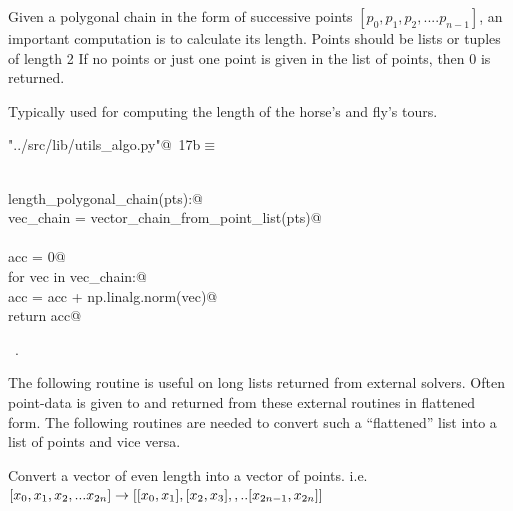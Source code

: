 \documentclass[11.5pt]{report}
\begin{document}
\newchunk Given a polygonal chain in the form of successive points  $[p_0,p_1,p_2,....p_{n-1}]$, 
an important computation is to calculate its length. Points should be lists or tuples of length 2
If no points or just one point is given in the list of points, then 0 is returned.

Typically used for computing the length of the horse's and fly's tours. 

\begin{flushleft} \small\label{scrap13}\raggedright\small
{} \verb@"../src/lib/utils_algo.py"@\nobreak\ {\footnotesize {17b}}$\equiv$
\vspace{-1ex}
\begin{list}{}{} \item
\mbox{}\verb@@\\
\mbox{}\verb@def length_polygonal_chain(pts):@\\
\mbox{}\verb@    vec_chain = vector_chain_from_point_list(pts)@\\
\mbox{}\verb@@\\
\mbox{}\verb@    acc = 0@\\
\mbox{}\verb@    for vec in vec_chain:@\\
\mbox{}\verb@        acc = acc + np.linalg.norm(vec)@\\
\mbox{}\verb@    return acc@\\
\mbox{}\verb@@{\NWsep}
\end{list}
\vspace{-1.5ex}
\footnotesize
\begin{list}{}{\setlength{\itemsep}{-\parsep}\setlength{\itemindent}{-\leftmargin}}
\item \NWtxtFileDefBy\ .

\item{}
\end{list}
\vspace{4ex}
\end{flushleft}
\newchunk The following routine is useful on long lists returned from external solvers. 
Often point-data is given to and returned from these external routines in flattened
form. The following routines are needed to convert such a ``flattened'' list into 
a list of points and vice versa. 

Convert a vector of even length into a vector of points. i.e. 
$[x_0,x_1,x_2,...x_{2n}] \rightarrow [[x_0,x_1],[x_2,x_3],,..[x_{2n-1},x_{2n}]]$
\end{document}
